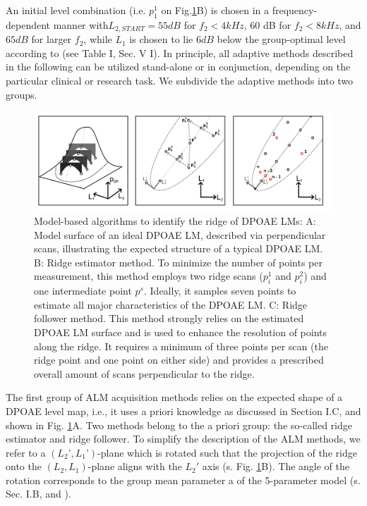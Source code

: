 \documentclass[journal,twoside,web]{ieeecolor2}
\begin{document}
An initial level combination (i.e.
$p_1^1$ on Fig.\ref{fig_AMB}B) is chosen in a frequency-dependent manner with$L_{2,START} = 55 dB$ for $f_2 < 4 kHz$, 60 dB for $f_2 < 8 kHz$, and $65 dB$ for larger $f_2$, while $L_1$ is chosen to lie $6 dB$ below the group-optimal level according to \cite{ZD2020} (see Table I, Sec. V  I).
 In principle, all adaptive methods described in the following can be utilized stand-alone or in conjunction, depending on the particular clinical or research task.
We subdivide the adaptive methods into two groups.

\begin{figure}
\includegraphics[width=\textwidth]{Fig_ALM_ModelBased} %
\caption{Model-based algorithms to identify the ridge of DPOAE LMs: A: Model surface of an ideal DPOAE LM, described via perpendicular scans, illustrating the expected structure of a typical DPOAE LM.
B: Ridge estimator method.
To minimize the number of points per measurement, this method employs two ridge scans ($p^1_i$ and $p^2_i$) and one intermediate point $p^s$.
Ideally, it samples seven points to estimate all major characteristics of the DPOAE LM.
C: Ridge follower method.
This method strongly relies on the estimated DPOAE LM surface and is used to enhance the resolution of points along the ridge.
It requires a minimum of three points per scan (the ridge point and one point on either side) and provides a prescribed overall amount of scans perpendicular to the ridge.}
\label{fig_AMB}
\end{figure}

The first group of ALM acquisition methods relies on the expected shape of a DPOAE level map, i.e., it uses a priori knowledge as discussed in Section I.C, and shown in Fig. \ref{fig_AMB}A.
Two methods belong to the a priori group: the so-called ridge estimator and ridge follower.
To simplify the description of the ALM methods, we refer to a $(L_2’, L_1’)$-plane which is rotated such that the projection of the ridge onto the $(L_2, L_1)$-plane aligns with the $L_2'$ axis (s. Fig. \ref{fig_AMB}B).
The angle of the rotation corresponds to the group mean parameter a of the 5-parameter model (s. Sec. I.B, and \cite{ZD2020}).
\end{document}
